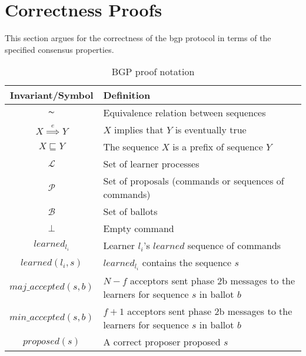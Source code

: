\section{Correctness Proofs} \label{bft_proof}

This section argues for the correctness of the \acrlong{bgp} protocol in terms of the specified consensus properties.\par

\begin{table}[h!]
	\renewcommand{\arraystretch}{1.5}
	\centering
	\begin{tabularx}{\linewidth}{ |c|X|}
		\hline
		Invariant/Symbol & Definition \\
		\hline
		$\thicksim$ & Equivalence relation between sequences \\
		\hline
		$X \overset{e}{\implies} Y$ & $X$ implies that $Y$ is eventually true \\
		\hline
		$X \sqsubseteq Y$ & The sequence $X$ is a prefix of sequence $Y$ \\
		\hline
		$\mathcal{L}$ & Set of learner processes \\
		\hline
		$\mathcal{P}$ & Set of proposals (commands or sequences of commands) \\
		\hline
		$\mathcal{B}$ & Set of ballots \\
		\hline
		$\bot$ & Empty command \\
		\hline		
		$learned_{l_i}$ & Learner $l_i$'s $learned$ sequence of commands \\
		\hline
		$learned(l_i,s)$ & $learned_{l_i}$ contains the sequence $s$ \\
		\hline
		$maj\_accepted(s,b)$ & $N-f$ acceptors sent phase 2b messages to the learners for sequence $s$ in ballot $b$ \\
		\hline
		$min\_accepted(s,b)$ & $f+1$ acceptors sent phase 2b messages to the learners for sequence $s$ in ballot $b$\\
		\hline
		$proposed(s)$ & A correct proposer proposed $s$ \\
		\hline
		
	\end{tabularx} 
	\vspace{\smallskipamount}
	\caption{BGP proof notation} 
	\label{table:bft_proof}
\end{table}

